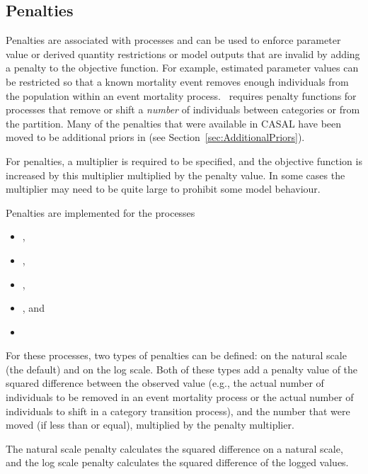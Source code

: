 \subsection{Penalties}\label{sec:Penalty}\label{sec:Penalty-Process}

Penalties are associated with processes and can be used to enforce parameter value or derived quantity restrictions or model outputs that are invalid by adding a penalty to the objective function. For example, estimated parameter values can be restricted so that a known mortality event removes enough individuals from the population within an event mortality process. \CNAME\ requires penalty functions for processes that remove or shift a \emph{number} of individuals between categories or from the partition. Many of the penalties that were available in CASAL have been moved to be additional priors in \CNAME (see Section~\ref{sec:AdditionalPriors}).

For penalties, a multiplier is required to be specified, and the objective function is increased by this multiplier multiplied by the penalty value. In some cases the multiplier may need to be quite large to prohibit some model behaviour.

Penalties are implemented for the processes

\begin{itemize}
	\item {},
	\item {},
	\item {},
	\item {}, and
	\item {}
\end{itemize}

For these processes, two types of penalties can be defined: on the natural scale (the default) and on the log scale. Both of these types add a penalty value of the squared difference between the observed value (e.g., the actual number of individuals to be removed in an event mortality process or the actual number of individuals to shift in a category transition process), and the number that were moved (if less than or equal), multiplied by the penalty multiplier.

The natural scale penalty calculates the squared difference on a natural scale, and the log scale penalty calculates the squared difference of the logged values.

